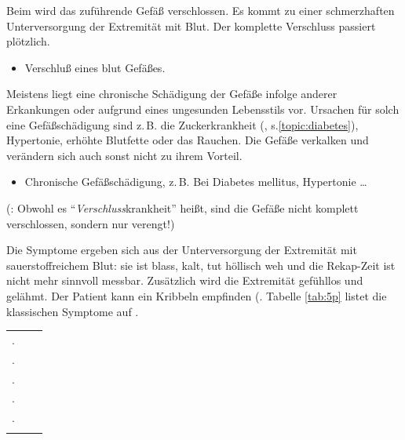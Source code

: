 {
Beim  wird das
zuführende Gefäß verschlossen. Es kommt zu einer schmerzhaften 
Unterversorgung der Extremität mit Blut. Der komplette
Verschluss passiert plötzlich. 
}
{
\begin{itemize}
    \item Verschluß eines blut Gefäßes.
\end{itemize}
}{}{}{}

{%
Meistens liegt eine 
chronische Schädigung der Gefäße infolge anderer Erkankungen oder aufgrund eines ungesunden
Lebensstils vor. Ursachen für solch eine Gefäßschädigung
sind z.\,B. die Zuckerkrankheit (,
s.\ref{topic:diabetes}), Hypertonie, erhöhte Blutfette oder
das Rauchen. Die Gefäße verkalken und verändern sich auch sonst
nicht zu ihrem Vorteil.
}
{
\begin{itemize}
  \item Chronische Gefäßschädigung, z.\,B. Bei Diabetes mellitus, Hypertonie \ldots
\end{itemize}
}{}{}{}




 (: Obwohl es
"`\emph{Verschluss}krankheit"' heißt, sind die Gefäße nicht komplett
verschlossen, sondern nur verengt!)

\Layout{}{}{}{}{}{}{}

{
Die Symptome ergeben sich aus der Unterversorgung der
Extremität mit sauerstoffreichem Blut: sie ist blass,
kalt, tut höllisch weh und die Rekap-Zeit ist nicht
mehr sinnvoll messbar. Zusätzlich wird die Extremität
gefühllos und gelähmt. Der Patient kann ein Kribbeln
empfinden (. Tabelle \ref{tab:5p}
listet die klassischen Symptome auf .
}{
\label{tab:5p}

\begin{tabulary}{\linewidth}{CLL}
\midrule\addlinespace
{}. & \noindent{}        & \noindent{}
\\
. & \noindent{}        & \noindent{}
\\
. & \noindent{}    & \noindent{}
\\
. & \noindent{} & \noindent{}
\\
. & \noindent{}   & \noindent{}
\\\addlinespace\bottomrule
\end{tabulary}
}{}{}{}


